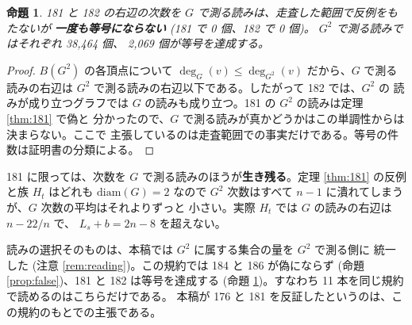 \documentclass[paper=a4,fontsize=10.5pt,jafontsize=10.5pt]{jlreq}
\theoremstyle{plain}
\newtheorem{proposition}[theorem]{命題}
\theoremstyle{definition}
\begin{document}
\begin{proposition}\label{prop:weak}
181 と 182 の右辺の次数を $G$ で測る読みは、走査した範囲で反例をもたないが
\textbf{一度も等号にならない} (181 で 0 個、182 で 0 個)。
$G^2$ で測る読みではそれぞれ 38,464 個、
2,069 個が等号を達成する。
\end{proposition}

\begin{proof}
$B(G^2)$ の各頂点について $\deg_G(v) \le \deg_{G^2}(v)$ だから、$G$ で測る
読みの右辺は $G^2$ で測る読みの右辺以下である。したがって 182 では、$G^2$ の
読みが成り立つグラフでは $G$ の読みも成り立つ。181 の $G^2$ の読みは定理
\ref{thm:181} で偽と
分かったので、$G$ で測る読みが真かどうかはこの単調性からは決まらない。ここで
主張しているのは走査範囲での事実だけである。等号の件数は証明書の分類による。
\end{proof}

181 に限っては、次数を $G$ で測る読みのほうが\textbf{生き残る}。定理
\ref{thm:181} の反例と族 $H_t$ はどれも $\mathrm{diam}(G) = 2$ なので
$G^2$ 次数はすべて $n - 1$ に潰れてしまうが、$G$ 次数の平均はそれよりずっと
小さい。実際 $H_t$ では $G$ の読みの右辺は $n - 22/n$ で、
$L_s + b = 2n - 8$ を超えない。

読みの選択そのものは、本稿では $G^2$ に属する集合の量を $G^2$ で測る側に
統一した (注意 \ref{rem:reading})。この規約では 184 と 186 が偽にならず
(命題 \ref{prop:false})、181 と 182 は等号を達成する (命題
\ref{prop:weak})。すなわち 11 本を同じ規約で読めるのはこちらだけである。
本稿が 176 と 181 を反証したというのは、この規約のもとでの主張である。
\end{document}
